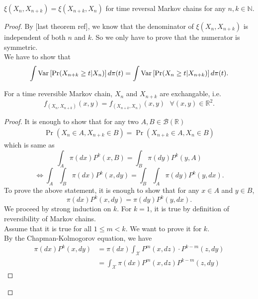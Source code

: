 \begin{theorem}
    $\xi(X_n, X_{n+k}) = \xi(X_{n+k}, X_n)$ for time reversal Markov chains for any $n, k \in \mathbb{N}$.
    \begin{proof}
        By [last theorem ref], we know that the denominator of $\xi(X_n, X_{n+k})$ is independent of both $n$ and $k$. So we only have to prove that the numerator is symmetric. \\
        We have to show that
        \begin{equation*}
            \int \text{Var}\left[{{\Pr (X_{n+k} \geq t | X_n)}}\right] d\pi(t) = \int \text{Var}\left[{{\Pr (X_n \geq t | X_{n+k})}}\right] d\pi(t).
        \end{equation*}
        \begin{lem}
            For a time reversible Markov chain, $X_n$ and $X_{n+k}$ are exchangable, i.e.
            \begin{equation*}
                f_{(X_{n}, X_{n+k})}(x, y) = f_{(X_{n+k}, X_{n})}(x, y) \text{  } \forall (x, y) \in \mathbb{R}^2.
            \end{equation*}
            \begin{proof}
                It is enough to show that for any two $A, B \in \mathcal{B}(\mathbb{R})$
                \begin{align*}
                    \Pr(X_n \in A, X_{n+k} \in B) = \Pr(X_{n+k} \in A, X_{n} \in B)
                \end{align*}
                which is same as
                    $$\int_A \pi(dx) P^k(x, B) = \int_B \pi(dy) P^k(y, A)$$
                    $$\Longleftrightarrow\int_A \int_B \pi(dx) P^k(x, dy) = \int_B \int_A \pi(dy) P^k(y, dx).$$
                To prove the above statement, it is enough to show that for any $x \in A$ and $y \in B$,
                $$\pi(dx) P^k(x, dy) = \pi(dy) P^k(y, dx).$$
                We proceed by strong induction on $k$.
                For $k = 1$, it is true by definition of reversibility of Markov chains.\\
                Assume that it is true for all $1 \leq m < k$.
                We want to prove it for $k$.\\
                By the Chapman-Kolmogorov equation, we have
                \begin{align*}
                    \pi(dx) P^k(x, dy) &= \pi(dx) \int_{\mathcal{X}} P^m(x, dz)\cdot P^{k-m}(z, dy)\\
                    &= \int_{\mathcal{X}} \pi(dx) P^m(x, dz) P^{k-m}(z, dy)
                \end{align*}

\end{proof}
\end{lem}
\end{proof}
\end{theorem}
